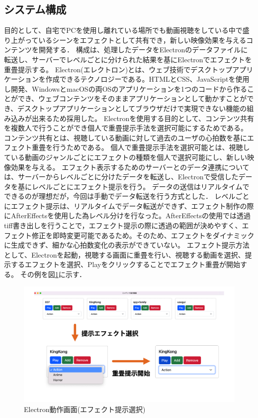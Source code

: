 \subsection{システム構成}
目的として、自宅でPCを使用し離れている場所でも動画視聴をしている中で盛り上がっているシーンをエフェクトとして共有でき，新しい映像効果を与えるコンテンツを開発する．
構成は、処理したデータをElectronのデータファイルに転送し、サーバーでレベルごとに分けられた結果を基にElectronでエフェクトを重畳提示する。
Electron(エレクトロン)とは、ウェブ技術でデスクトップアプリケーションを作成できるテクノロジーである。HTMLとCSS、JavaScriptを使用し開発、WindowsとmacOSの両OSのアプリケーションを1つのコードから作ることができ、ウェブコンテンツをそのままアプリケーションとして動かすことができ、デスクトップアプリケーションとしてブラウザだけで実現できない機能の組み込みが出来るため採用した。
Electronを使用する目的として、コンテンツ共有を複数人で行うことができ個人で重畳提示手法を選択可能にするためである。
コンテンツ共有とは、視聴している動画に対して過去のユーザの心拍数を基にエフェクト重畳を行うためである。
個人で重畳提示手法を選択可能とは、視聴している動画のジャンルごとにエフェクトの種類を個人で選択可能にし、新しい映像効果を与える。
エフェクト表示するためのサーバーとのデータ連携については、サーバーからレベルごとに分けたデータを転送し、Electronで受信したデータを基にレベルごとにエフェクト提示を行う。
データの送信はリアルタイムでできるのが理想だが，今回は手動でデータ転送を行う方式とした．
レベルごとにエフェクト提示は、リアルタイムでデータ転送ができず、エフェクト制作の際にAfterEffectsを使用した為レベル分けを行なった。AfterEffectsの使用では透過tiff書き出しを行うことで，エフェクト提示の際に透過の範囲が決めやすく、エフェクト修正を即時変更可能であるため。そのため、エフェクトをダイナミックに生成できず、細かな心拍数変化の表示ができていない。
エフェクト提示方法として、Electronを起動，視聴する画面に重畳を行い、視聴する動画を選択、提示するエフェクトを選択、Playをクリックすることでエフェクト重畳が開始する。
その例を図\ref{efectsentaku}に示す．
 
\begin{figure}[H]
   \centering
   \includegraphics[width=17cm]{images/chapter3/efect_setumei.png}
   \caption{Electron動作画面(エフェクト提示選択)}
   \label{efectsentaku}
\end{figure}
 
